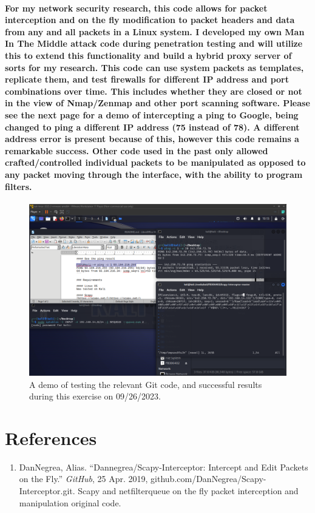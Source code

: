 \paragraph{\quad For my network security research, this code allows for packet interception and on the fly modification to packet headers and data from any and all packets in a Linux system. I developed my own Man In The Middle attack code during penetration testing and will utilize this to extend this functionality and build a hybrid proxy server of sorts for my research. This code can use system packets as templates, replicate them, and test firewalls for different IP address and port combinations over time. This includes whether they are closed or not in the view of Nmap/Zenmap and other port scanning software. Please see the next page for a demo of intercepting a ping to Google, being changed to ping a different IP address (75 instead of 78). A different address error is present because of this, however this code remains a remarkable success. Other code used in the past only allowed crafted/controlled individual packets to be manipulated as opposed to any packet moving through the interface, with the ability to program filters.}
\clearpage
\begin{figure}[ht!]
\centering
\caption{\label{fig:CColvin2023-09-26 08 13 39} A demo of testing the relevant Git code, and successful results during this exercise on 09/26/2023.}
\includegraphics[width=1.35\textwidth, height=1\textwidth]{CColvin2023-09-26 08 13 39.png}
\end{figure}
\section{References}
\begin{enumerate}
    \item[] DanNegrea, Alias. “Dannegrea/Scapy-Interceptor: Intercept and Edit Packets on the Fly.” \textit{GitHub}, 25 Apr. 2019, github.com/DanNegrea/Scapy-Interceptor.git. Scapy and netfilterqueue on the fly packet interception and manipulation original code.
\end{enumerate}
